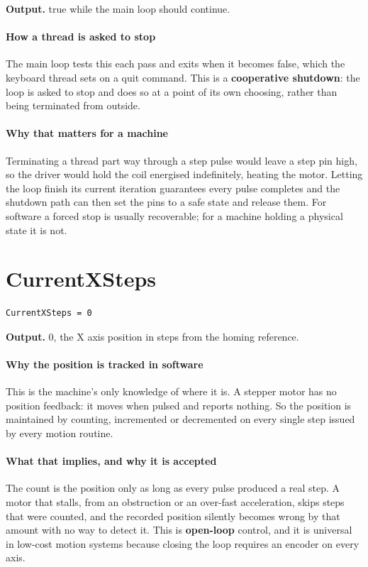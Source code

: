 \noindent\textbf{Output.} true while the main loop should continue.


\paragraph{How a thread is asked to stop}
The main loop tests this each pass and exits when it becomes false, which the keyboard thread sets on a quit command. This is a \textbf{cooperative shutdown}: the loop is asked to stop and does so at a point of its own choosing, rather than being terminated from outside.


\paragraph{Why that matters for a machine}
Terminating a thread part way through a step pulse would leave a step pin high, so the driver would hold the coil energised indefinitely, heating the motor. Letting the loop finish its current iteration guarantees every pulse completes and the shutdown path can then set the pins to a safe state and release them. For software a forced stop is usually recoverable; for a machine holding a physical state it is not.


\section{CurrentXSteps}
\begin{lstlisting}[style=sig]
CurrentXSteps = 0
\end{lstlisting}

\noindent\textbf{Output.} 0, the X axis position in steps from the homing reference.


\paragraph{Why the position is tracked in software}
This is the machine's only knowledge of where it is. A stepper motor has no position feedback: it moves when pulsed and reports nothing. So the position is maintained by counting, incremented or decremented on every single step issued by every motion routine.


\paragraph{What that implies, and why it is accepted}
The count is the position only as long as every pulse produced a real step. A motor that stalls, from an obstruction or an over-fast acceleration, skips steps that were counted, and the recorded position silently becomes wrong by that amount with no way to detect it. This is \textbf{open-loop} control, and it is universal in low-cost motion systems because closing the loop requires an encoder on every axis.

